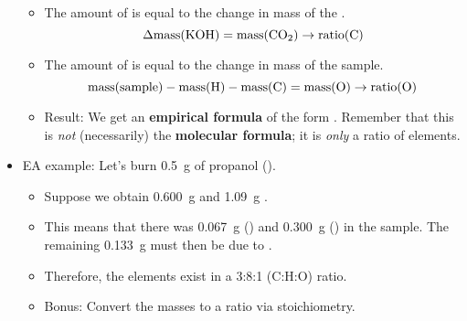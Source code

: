 \documentclass[../notes.tex]{subfiles}
\begin{document}
\begin{itemize}
\begin{itemize}
\begin{equation*}
        \end{equation*}
        \item The amount of  is equal to the change in mass of the .
        \begin{equation*}
            \Delta\text{mass}(\ce{KOH}) = \text{mass}(\ce{CO2})
            \to \text{ratio}(\ce{C})
        \end{equation*}
        \item The amount of  is equal to the change in mass of the sample.
        \begin{equation*}
            \text{mass}(\text{sample})-\text{mass}(\ce{H})-\text{mass}(\ce{C}) = \text{mass}(\ce{O})
             \to \text{ratio}(\ce{O})
        \end{equation*}
        \item Result: We get an \textbf{empirical formula} of the form . Remember that this is \emph{not} (necessarily) the \textbf{molecular formula}; it is \emph{only} a ratio of elements.
    \end{itemize}
    \item EA example: Let's burn \SI{0.5}{\gram} of propanol ().
    \begin{itemize}
        \item Suppose we obtain \SI{0.600}{\gram}  and \SI{1.09}{\gram} .
        \item This means that there was \SI{0.067}{\gram} () and \SI{0.300}{\gram} () in the sample. The remaining \SI{0.133}{\gram} must then be due to .
        \item Therefore, the elements exist in a 3:8:1 (C:H:O) ratio.
        \item Bonus: Convert the masses to a ratio via stoichiometry.
\end{itemize}
\end{itemize}
\end{document}
